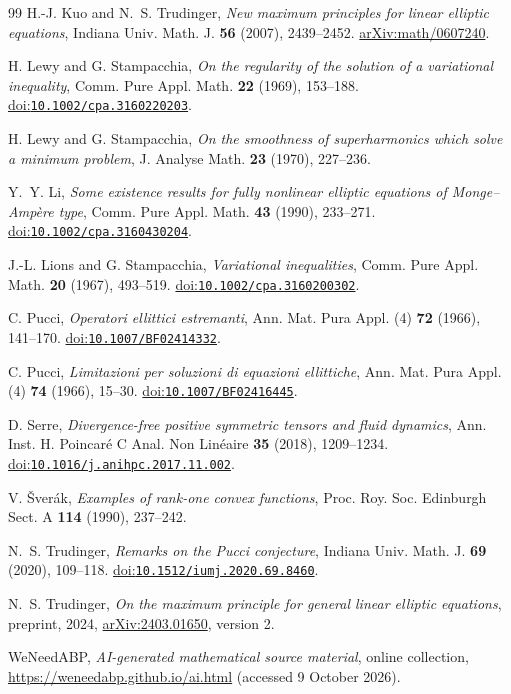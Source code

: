 \documentclass[11pt,a4paper,reqno]{amsart}
\theoremstyle{plain}
\theoremstyle{remark}
\numberwithin{equation}{section}
\newcommand{\doi}[1]{\href{https://doi.org/#1}{doi:\nolinkurl{#1}}}
\begin{document}
\begin{thebibliography}{99}
H.-J. Kuo and N.~S. Trudinger,
\emph{New maximum principles for linear elliptic equations},
Indiana Univ. Math. J. \textbf{56} (2007), 2439--2452.
\href{https://arxiv.org/abs/math/0607240}{arXiv:math/0607240}.

H. Lewy and G. Stampacchia,
\emph{On the regularity of the solution of a variational inequality},
Comm. Pure Appl. Math. \textbf{22} (1969), 153--188.
\doi{10.1002/cpa.3160220203}.

H. Lewy and G. Stampacchia,
\emph{On the smoothness of superharmonics which solve a minimum problem},
J. Analyse Math. \textbf{23} (1970), 227--236.

Y.~Y. Li,
\emph{Some existence results for fully nonlinear elliptic equations of Monge--Amp\`ere type},
Comm. Pure Appl. Math. \textbf{43} (1990), 233--271.
\doi{10.1002/cpa.3160430204}.

J.-L. Lions and G. Stampacchia,
\emph{Variational inequalities},
Comm. Pure Appl. Math. \textbf{20} (1967), 493--519.
\doi{10.1002/cpa.3160200302}.

C. Pucci,
\emph{Operatori ellittici estremanti},
Ann. Mat. Pura Appl. (4) \textbf{72} (1966), 141--170.
\doi{10.1007/BF02414332}.

C. Pucci,
\emph{Limitazioni per soluzioni di equazioni ellittiche},
Ann. Mat. Pura Appl. (4) \textbf{74} (1966), 15--30.
\doi{10.1007/BF02416445}.

D. Serre,
\emph{Divergence-free positive symmetric tensors and fluid dynamics},
Ann. Inst. H. Poincar\'e C Anal. Non Lin\'eaire \textbf{35} (2018), 1209--1234.
\doi{10.1016/j.anihpc.2017.11.002}.

V. \v{S}ver\'ak,
\emph{Examples of rank-one convex functions},
Proc. Roy. Soc. Edinburgh Sect. A \textbf{114} (1990), 237--242.

N.~S. Trudinger,
\emph{Remarks on the Pucci conjecture},
Indiana Univ. Math. J. \textbf{69} (2020), 109--118.
\doi{10.1512/iumj.2020.69.8460}.

N.~S. Trudinger,
\emph{On the maximum principle for general linear elliptic equations},
preprint, 2024, \href{https://arxiv.org/abs/2403.01650}{arXiv:2403.01650}, version 2.

WeNeedABP,
\emph{AI-generated mathematical source material}, online collection,
\url{https://weneedabp.github.io/ai.html}
(accessed 9 October 2026).

\end{thebibliography}
\end{document}
